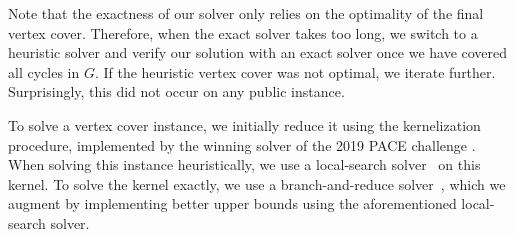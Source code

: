 Note that the exactness of our solver only relies on the optimality of the final vertex cover. Therefore, when the exact solver takes too long, we switch to a heuristic solver and verify our solution with an exact solver once we have covered all cycles in $G$. If the heuristic vertex cover was not optimal, we iterate further. Surprisingly, this did not occur on any public instance.

To solve a vertex cover instance, we initially reduce it using the kernelization procedure, implemented by the winning solver of the 2019 PACE challenge \cite{Hespe2020WeGotYouCoveredTW}.
When solving this instance heuristically, we use a local-search solver~\cite{Cai2013NuMVCAE} on this kernel.
To solve the kernel exactly, we use a branch-and-reduce solver~\cite{pg21satreduce}, which we augment by implementing better upper bounds using the aforementioned local-search solver.

